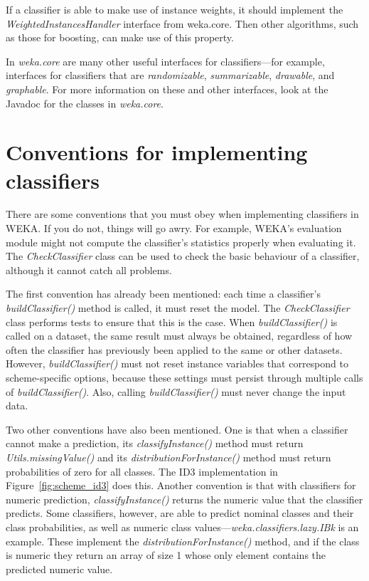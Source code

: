 If a classifier is able to make use of instance weights, it should
implement the \textit{WeightedInstancesHandler} interface from
weka.core. Then other algorithms, such as those for boosting, can make
use of this property.

In {\em weka.core} are many other useful interfaces for classifiers---for
example, interfaces for classifiers that are \textit{randomizable},
\textit{summarizable}, \textit{drawable}, and \textit{graphable}. 
For more information on these
and other interfaces, look at the Javadoc for the classes in
\textit{weka.core}.


\section{Conventions for implementing classifiers}
\label{subsec:conventions}

There are some conventions that you must obey when implementing
classifiers in WEKA. If you do not, things will go awry. For example,
WEKA's evaluation module might not compute the classifier's statistics
properly when evaluating it. The \textit{CheckClassifier} class can be used to
check the basic behaviour of a classifier, although it cannot catch
all problems.

The first convention has already been mentioned: each time a
classifier's \textit{buildClassifier()} method is called, it must reset the
model. The \textit{CheckClassifier} class performs tests to ensure that this is
the case. When \textit{buildClassifier()} is called on a dataset, the same
result must always be obtained, regardless of how often the classifier
has previously been applied to the same or other datasets. However,
\textit{buildClassifier()} must not reset instance variables that correspond to
scheme-specific options, because these settings must persist through
multiple calls of \textit{buildClassifier()}. Also,
calling \textit{buildClassifier()} must never change the input data.

Two other conventions have also been mentioned. One is that when a
classifier cannot make a prediction, its \textit{classifyInstance()}
method must return \textit{Utils.missingValue()} and
its \textit{distributionForInstance()} method must return
probabilities of zero for all classes. The ID3 implementation in
Figure~\ref{fig:scheme_id3} does this. Another convention is that with
classifiers for numeric prediction, \textit{classifyInstance()}
returns the numeric value that the classifier predicts. Some
classifiers, however, are able to predict nominal classes and their
class probabilities, as well as numeric class
values---\textit{weka.classifiers.lazy.IBk} is an example. These implement the
\textit{distributionForInstance()} method, and if the class is numeric they
return an array of size 1 whose only element contains the predicted
numeric value.


